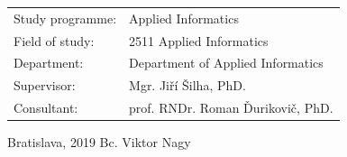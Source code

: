\documentclass[12pt, a4paper, oneside]{book}
\newcommand\mfauthor{Bc. Viktor Nagy}
\newcommand\mfadvisor{Mgr. Jiří Šilha, PhD.}
\newcommand\mfconsultant{prof. RNDr. Roman Ďurikovič, PhD.}
\newcommand\mfplacedate{Bratislava, 2019}
\begin{document}
\vfill
\begin{tabular}{l l}
Study programme: & Applied Informatics\\
Field of study: & 2511 Applied Informatics\\
Department: & Department of Applied Informatics\\
Supervisor: & \mfadvisor\\
Consultant: & \mfconsultant
\end{tabular}
\vfill
\noindent
\mfplacedate \hfill
\mfauthor
\eject




\begin{figure}[H]
\vspace*{-3.5cm}
\begin{center}
\label{img:zadanie}
\end{center}
\end{figure}
\end{document}
